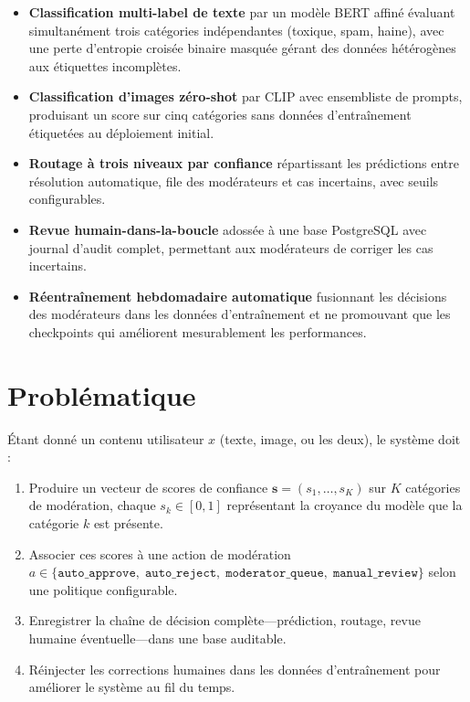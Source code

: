\begin{itemize}[nosep]
  \item \textbf{Classification multi-label de texte} par un modèle BERT affiné évaluant simultanément trois catégories indépendantes (toxique, spam, haine), avec une perte d'entropie croisée binaire masquée gérant des données hétérogènes aux étiquettes incomplètes.
  \item \textbf{Classification d'images zéro-shot} par CLIP avec ensembliste de prompts, produisant un score sur cinq catégories sans données d'entraînement étiquetées au déploiement initial.
  \item \textbf{Routage à trois niveaux par confiance} répartissant les prédictions entre résolution automatique, file des modérateurs et cas incertains, avec seuils configurables.
  \item \textbf{Revue humain-dans-la-boucle} adossée à une base PostgreSQL avec journal d'audit complet, permettant aux modérateurs de corriger les cas incertains.
  \item \textbf{Réentraînement hebdomadaire automatique} fusionnant les décisions des modérateurs dans les données d'entraînement et ne promouvant que les checkpoints qui améliorent mesurablement les performances.
\end{itemize}

\section{Problématique}

Étant donné un contenu utilisateur $x$ (texte, image, ou les deux), le système doit :

\begin{enumerate}[nosep]
  \item Produire un vecteur de scores de confiance $\mathbf{s} = (s_1, \ldots, s_K)$ sur $K$ catégories de modération, chaque $s_k \in [0, 1]$ représentant la croyance du modèle que la catégorie $k$ est présente.
  \item Associer ces scores à une action de modération $a \in \{\texttt{auto\_approve},\; \texttt{auto\_reject},\; \texttt{moderator\_queue},\; \texttt{manual\_review}\}$ selon une politique configurable.
  \item Enregistrer la chaîne de décision complète---prédiction, routage, revue humaine éventuelle---dans une base auditable.
  \item Réinjecter les corrections humaines dans les données d'entraînement pour améliorer le système au fil du temps.
\end{enumerate}

